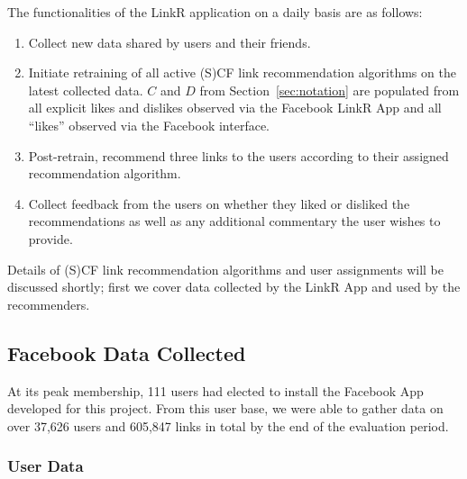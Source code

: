The functionalities of the LinkR application on a daily basis are as follows:
\begin{enumerate}
\item{Collect new data shared by users and their friends.}
\item{Initiate retraining of all active (S)CF link recommendation algorithms on the latest collected data.  $C$ and $D$ from Section~\ref{sec:notation}
are populated from 
all explicit likes and dislikes observed via the Facebook LinkR App
and all ``likes'' observed via the Facebook interface.}
\item{Post-retrain, recommend three links to the users according to their assigned recommendation algorithm.}
\item{Collect feedback from the users on whether they liked or disliked the recommendations as well as any additional commentary the user wishes to provide.}
\end{enumerate}
Details of (S)CF link recommendation algorithms and user assignments
will be discussed shortly; first we cover data
collected by the LinkR App and used by the recommenders.

\subsection{Facebook Data Collected}

\label{sec:dataset}

At its peak membership, 111 users had elected to install the Facebook
App developed for this project.  From this user base, we were able to
gather data on over 37,626 users and 605,847 links in total by the end of
the evaluation period.

\subsubsection{User Data}

